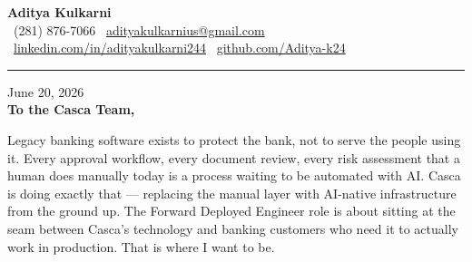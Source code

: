 \documentclass[11pt,letterpaper]{article}
\begin{document}
\begin{center}
    {\Huge \textbf{\color{CascaNavy} Aditya Kulkarni}}\\[8pt]
    {\color{DarkGrey} \small
    \faPhone \ (281) 876-7066 \quad \textbar \quad
    \faEnvelope \ \href{mailto:adityakulkarnius@gmail.com}{adityakulkarnius@gmail.com} \\[4pt]
    \faLinkedin \ \href{https://linkedin.com/in/adityakulkarni244}{linkedin.com/in/adityakulkarni244} \quad \textbar \quad
    \faGithub \ \href{https://github.com/Aditya-k24}{github.com/Aditya-k24}
    }
\end{center}

\vspace{-4pt}
{\color{CascaNavy}\rule{\linewidth}{1.5pt}}
\vspace{10pt}

June 20, 2026\\[10pt]
\textbf{To the Casca Team,}

\vspace{6pt}

Legacy banking software exists to protect the bank, not to serve the people using it. Every approval workflow, every document review, every risk assessment that a human does manually today is a process waiting to be automated with AI. Casca is doing exactly that --- replacing the manual layer with AI-native infrastructure from the ground up. The Forward Deployed Engineer role is about sitting at the seam between Casca's technology and banking customers who need it to actually work in production. That is where I want to be.

\vspace{4pt}
\end{document}
